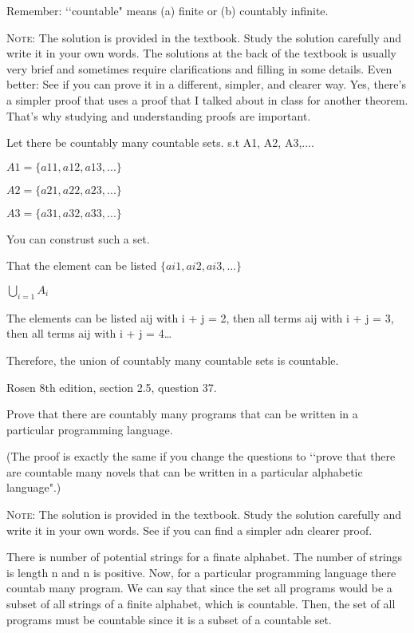 Remember: \lq\lq countable" means (a) finite or (b) countably infinite.

\textsc{Note:} The solution is provided in the textbook.
Study the solution carefully and write it in your own words.
The solutions at the back of the textbook is usually very brief and
sometimes require clarifications and filling in some details.
Even better: See if you can prove it in a different, simpler, and clearer way.
Yes, there's a simpler proof that uses a proof that I talked about in class
for another theorem.
That's why studying and understanding proofs are important. 

\SOLUTION

Let there be countably many countable sets. s.t A1, A2, A3,....

$ A1 = \{a11,a12,a13,...\}$

$ A2 = \{a21,a22,a23,...\}$

$ A3 = \{a31,a32,a33,...\}$

You can construst such a set.

That the element can be listed $\{ai1,ai2,ai3,...\}$

$\bigcup_{i=1} A_i$ 

The elements can be listed aij with i + j = 2, then all terms aij
with i + j = 3, then all terms aij with i + j = 4\dots

Therefore, the union of countably many countable sets is countable.



\newpage
\nextq Rosen 8th edition, section 2.5, question 37.

Prove that there are countably many programs that can be written in a
particular programming language.

(The proof is exactly the same if you change the questions to \lq\lq prove
that there are countable many novels that can be written in a particular
alphabetic language".)

\textsc{Note:} The solution is provided in the textbook.
Study the solution carefully and write it in your own words.
See if you can find a simpler adn clearer proof.

\SOLUTION

There is number of potential strings for a finate alphabet. The number of strings is length n and n is positive.
Now, for a particular programming language there countab many program. We can say that since the set
 all programs would be a subset of all strings of a finite alphabet, which is countable.
Then, the set of all programs must be countable since it is a subset of a countable set. 

